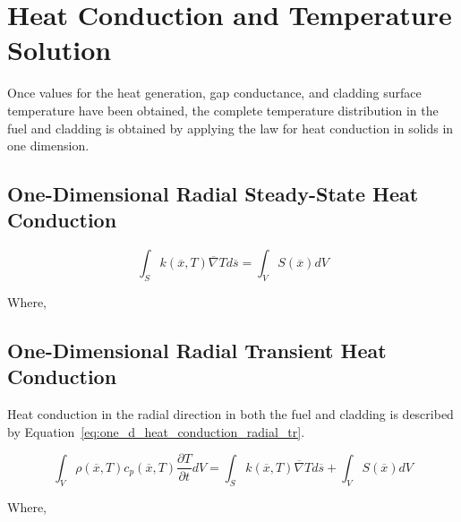 \section{Heat Conduction and Temperature Solution}\label{section:heat-conduction-and-temperature-solution}

Once values for the heat generation, gap conductance, and cladding surface temperature have been
obtained, the complete temperature distribution in the fuel and cladding is obtained by applying the
law for heat conduction in solids in one dimension.

\subsection{One-Dimensional Radial Steady-State Heat Conduction}\label{section:one-dimensional-radial-steady-state-heat-conduction}

\begin{equation}
    \label{eq:one_d_heat_conduction_radial_ss}
    \int_{S}^{}{k(\overline{x},T)\overline{\nabla}Td\overline{s}} = \int_{V}^{}S(\overline{x})dV
\end{equation}

Where,

\subsection{One-Dimensional Radial Transient Heat Conduction}\label{section:one-dimensional-radial-transient-heat-conduction}

Heat conduction in the radial direction in both the fuel and cladding is
described by Equation~\ref{eq:one_d_heat_conduction_radial_tr}.

\begin{equation}
    \label{eq:one_d_heat_conduction_radial_tr}
    \int_{V}^{}{\rho(\overline{x},T) c_{p}(\overline{x},T)\frac{\partial T}{\partial t}dV} = \int_{S}^{}{k(\overline{x},T)\overline{\nabla}Td\overline{s}} + \int_{V}^{}S(\overline{x})dV
\end{equation}

Where,

